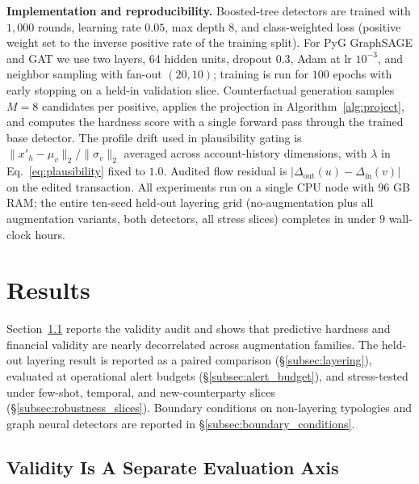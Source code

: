 \documentclass[sigconf,review,anonymous]{acmart}
\begin{document}
\textbf{Implementation and reproducibility.}
Boosted-tree detectors are trained with $1{,}000$ rounds, learning rate
$0.05$, max depth $8$, and class-weighted loss (positive weight set to the
inverse positive rate of the training split). For PyG GraphSAGE and GAT we
use two layers, 64 hidden units, dropout 0.3, Adam at lr $10^{-3}$, and
neighbor sampling with fan-out $(20,10)$; training is run for $100$ epochs
with early stopping on a held-in validation slice. Counterfactual generation
samples $M{=}8$ candidates per positive, applies the projection in
Algorithm~\ref{alg:project}, and computes the hardness score with a single
forward pass through the trained base detector. The profile drift used in
plausibility gating is $\|x'_h-\mu_v\|_2/\|\sigma_v\|_2$ averaged across
account-history dimensions, with $\lambda$ in Eq.~\ref{eq:plausibility} fixed
to $1.0$. Audited flow residual is $|\Delta_{\text{out}}(u)-\Delta_{\text{in}}(v)|$
on the edited transaction. All experiments run on a single CPU node with
$96$ GB RAM; the entire ten-seed held-out layering grid (no-augmentation plus
all augmentation variants, both detectors, all stress slices) completes in
under $9$ wall-clock hours.

\section{Results}
\label{sec:results}

Section~\ref{subsec:validity} reports the validity audit and shows that
predictive hardness and financial validity are nearly decorrelated across
augmentation families. The held-out layering result is reported as a paired
comparison (\S\ref{subsec:layering}), evaluated at operational alert budgets
(\S\ref{subsec:alert_budget}), and stress-tested under few-shot, temporal,
and new-counterparty slices (\S\ref{subsec:robustness_slices}). Boundary
conditions on non-layering typologies and graph neural detectors are
reported in \S\ref{subsec:boundary_conditions}.

\subsection{Validity Is A Separate Evaluation Axis}
\label{subsec:validity}
\end{document}
